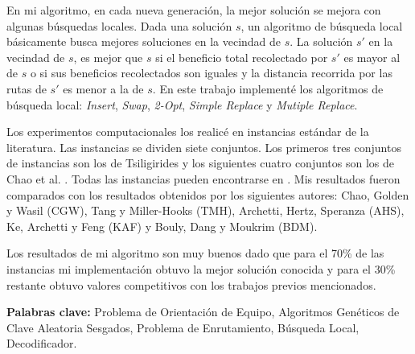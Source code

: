 \bigskip

En mi algoritmo, en cada nueva generación, la mejor solución se mejora con algunas búsquedas locales. Dada una solución $s$, un algoritmo de búsqueda local básicamente busca mejores soluciones en la vecindad de $s$. La solución $s'$ en la vecindad de $s$, es mejor que $s$ si el beneficio total recolectado por $s'$ es mayor al de $s$ o si sus beneficios recolectados son iguales y la distancia recorrida por las rutas de $s'$ es menor a la de $s$. En este trabajo implementé los algoritmos de búsqueda local: \textit{Insert}, \textit{Swap}, \textit{2-Opt}, \textit{Simple Replace} y \textit{Mutiple Replace}.

\bigskip

Los experimentos computacionales los realicé en instancias estándar de la literatura. Las instancias se dividen siete conjuntos. Los primeros tres conjuntos de instancias son los de Tsiligirides \cite{Tsiligirides} y los siguientes cuatro conjuntos son los de Chao et al. \cite{ChaoGoldenWasil}. Todas las instancias pueden encontrarse en \cite{IntancesChaoTsiligirides}. Mis resultados fueron comparados con los resultados obtenidos por los siguientes autores: Chao, Golden y Wasil \cite{ChaoGoldenWasil} (CGW), Tang y Miller-Hooks \cite{TangMillerHooks} (TMH), Archetti, Hertz, Speranza \cite{ArchettiHertzSperanza} (AHS), Ke, Archetti y Feng \cite{KeArchettiFeng} (KAF) y Bouly, Dang y Moukrim \cite{BoulyDangMoukrim} (BDM). 

\bigskip

Los resultados de mi algoritmo son muy buenos dado que para el 70\% de las instancias mi implementación obtuvo la mejor solución conocida y para el 30\% restante obtuvo valores competitivos con los trabajos previos mencionados.

\bigskip

\noindent\textbf{Palabras clave:} Problema de Orientación de Equipo, Algoritmos Genéticos de Clave Aleatoria Sesgados, Problema de Enrutamiento, Búsqueda Local, Decodificador.